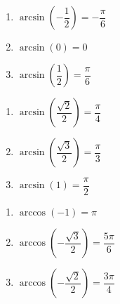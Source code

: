 \begin{multicols}{3} 

\begin{enumerate}

\setcounter{enumi}{\value{HW}}

\item $\arcsin \left( -\dfrac{1}{2} \right) = -\dfrac{\pi}{6}$
\item $\arcsin \left( 0 \right) = 0$ 
\item $\arcsin \left( \dfrac{1}{2} \right) = \dfrac{\pi}{6}$

\setcounter{HW}{\value{enumi}}

\end{enumerate}

\end{multicols}

\begin{multicols}{3} 

\begin{enumerate}

\setcounter{enumi}{\value{HW}}

\item $\arcsin \left( \dfrac{\sqrt{2}}{2} \right) = \dfrac{\pi}{4}$
\item $\arcsin \left( \dfrac{\sqrt{3}}{2} \right) = \dfrac{\pi}{3}$
\item $\arcsin \left( 1 \right) = \dfrac{\pi}{2}$ 

\setcounter{HW}{\value{enumi}}

\end{enumerate}

\end{multicols}

\begin{multicols}{3} 

\begin{enumerate}

\setcounter{enumi}{\value{HW}}

\item $\arccos \left( -1 \right) = \pi$ 
\item $\arccos \left( -\dfrac{\sqrt{3}}{2} \right) = \dfrac{5\pi}{6}$
\item $\arccos \left( -\dfrac{\sqrt{2}}{2} \right) = \dfrac{3\pi}{4}$

\setcounter{HW}{\value{enumi}}

\end{enumerate}

\end{multicols}

